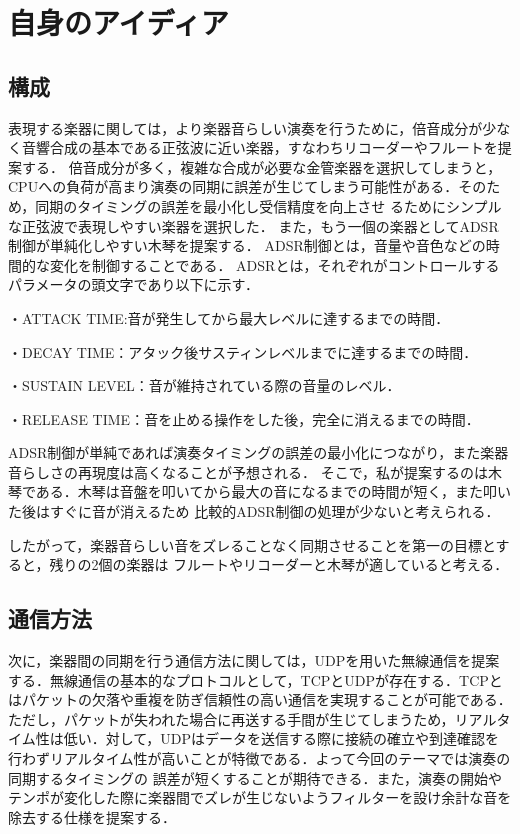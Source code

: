\documentclass[uplatex,dvipdfmx]{jlreq}
\begin{document}
\section{自身のアイディア}

\subsection{構成}
表現する楽器に関しては，より楽器音らしい演奏を行うために，倍音成分が少なく音響合成の基本である正弦波に近い楽器，すなわちリコーダーやフルートを提案する．
倍音成分が多く，複雑な合成が必要な金管楽器を選択してしまうと，CPUへの負荷が高まり演奏の同期に誤差が生じてしまう可能性がある．そのため，同期のタイミングの誤差を最小化し受信精度を向上させ
るためにシンプルな正弦波で表現しやすい楽器を選択した．
また，もう一個の楽器としてADSR制御が単純化しやすい木琴を提案する．
ADSR制御とは，音量や音色などの時間的な変化を制御することである\cite{ref:adsr}．
ADSRとは，それぞれがコントロールするパラメータの頭文字であり以下に示す．

・ATTACK TIME:音が発生してから最大レベルに達するまでの時間．\par
・DECAY TIME：アタック後サスティンレベルまでに達するまでの時間．\par
・SUSTAIN LEVEL：音が維持されている際の音量のレベル．\par
・RELEASE TIME：音を止める操作をした後，完全に消えるまでの時間．\par

ADSR制御が単純であれば演奏タイミングの誤差の最小化につながり，また楽器音らしさの再現度は高くなることが予想される．
そこで，私が提案するのは木琴である．木琴は音盤を叩いてから最大の音になるまでの時間が短く，また叩いた後はすぐに音が消えるため
比較的ADSR制御の処理が少ないと考えられる．

したがって，楽器音らしい音をズレることなく同期させることを第一の目標とすると，残りの2個の楽器は
フルートやリコーダーと木琴が適していると考える．

\subsection{通信方法}
次に，楽器間の同期を行う通信方法に関しては，UDPを用いた無線通信を提案する．無線通信の基本的なプロトコルとして，TCPとUDPが存在する．TCPとはパケットの欠落や重複を防ぎ信頼性の高い通信を実現することが可能である．
ただし，パケットが失われた場合に再送する手間が生じてしまうため，リアルタイム性は低い．対して，UDPはデータを送信する際に接続の確立や到達確認を行わずリアルタイム性が高いことが特徴である．よって今回のテーマでは演奏の同期するタイミングの
誤差が短くすることが期待できる．また，演奏の開始やテンポが変化した際に楽器間でズレが生じないようフィルターを設け余計な音を除去する仕様を提案する．
\end{document}
